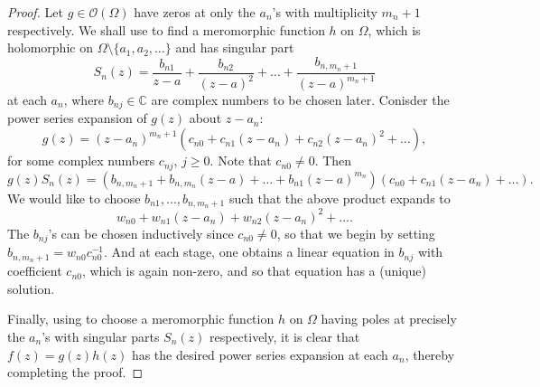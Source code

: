 \documentclass[11pt]{article}
\theoremstyle{thmstyle}
\theoremstyle{defstyle}
\newcommand{\bbC}{\mathbb{C}}
\newcommand{\scrO}{\mathscr{O}} %
\renewcommand{\ge}{\geqslant}
\begin{document}
\begin{proof}
    Let $g\in\scrO(\Omega)$ have zeros at only the $a_n$'s with multiplicity $m_n + 1$ respectively. We shall use  to find a meromorphic function $h$ on $\Omega$, which is holomorphic on $\Omega\setminus\{a_1, a_2,\dots\}$ and has singular part 
    \begin{equation*}
        S_n(z) = \frac{b_{n1}}{z - a} + \frac{b_{n2}}{(z - a)^2} + \dots + \frac{b_{n, m_n + 1}}{(z - a)^{m_n + 1}}
    \end{equation*}
    at each $a_n$, where $b_{nj}\in\bbC$ are complex numbers to be chosen later. Conisder the power series expansion of $g(z)$ about $z - a_n$: 
    \begin{equation*}
        g(z) = (z - a_n)^{m_n + 1}\left(c_{n0} + c_{n1}(z - a_n) + c_{n2}(z - a_n)^2 + \dots\right),
    \end{equation*}
    for some complex numbers $c_{nj}$, $j\ge 0$. Note that $c_{n0}\ne 0$. Then 
    \begin{equation*}
        g(z)S_n(z) = \left(b_{n, m_n + 1} + b_{n, m_n}(z - a) + \dots + b_{n1}(z - a)^{m_n}\right)\left(c_{n0} + c_{n1}(z - a_n) + \dots \right).
    \end{equation*}
    We would like to choose $b_{n1},\dots,b_{n, m_n + 1}$ such that the above product expands to 
    \begin{equation*}
        w_{n0} + w_{n1}(z - a_n) + w_{n2}(z - a_n)^2 + \dots.
    \end{equation*}
    The $b_{nj}$'s can be chosen inductively since $c_{n0}\ne 0$, so that we begin by setting $b_{n, m_n + 1} = w_{n0}c_{n0}^{-1}$. And at each stage, one obtains a linear equation in $b_{nj}$ with coefficient $c_{n0}$, which is again non-zero, and so that equation has a (unique) solution. 

    Finally, using  to choose a meromorphic function $h$ on $\Omega$ having poles at precisely the $a_n$'s with singular parts $S_n(z)$ respectively, it is clear that $f(z) = g(z)h(z)$ has the desired power series expansion at each $a_n$, thereby completing the proof.
\end{proof}
\end{document}
